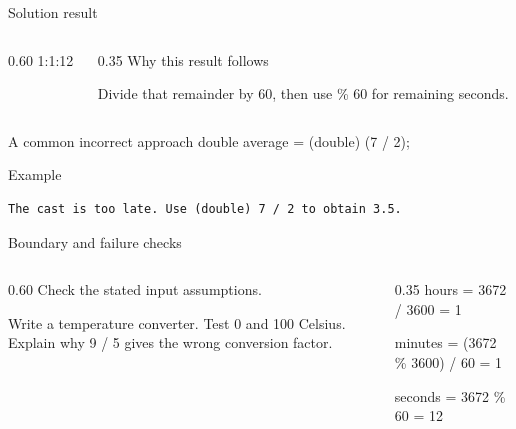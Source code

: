 \documentclass[10pt,aspectratio=169]{beamer}
\begin{document}
\begin{frame}[fragile,t]{Solution result}
\begin{columns}[T,onlytextwidth]\begin{column}{0.60\textwidth}
1:1:12
\end{column}\begin{column}{0.35\textwidth}\small
Why this result follows

Divide that remainder by 60, then use \% 60 for remaining seconds.
\end{column}\end{columns}
\end{frame}

\begin{frame}[fragile,t]{A common incorrect approach}
double average = (double) (7 / 2);
\vspace{1mm}\begin{block}{Example}
\begin{lstlisting}
The cast is too late. Use (double) 7 / 2 to obtain 3.5.
\end{lstlisting}
\end{block}
\end{frame}

\begin{frame}[fragile,t]{Boundary and failure checks}
\begin{columns}[T,onlytextwidth]\begin{column}{0.60\textwidth}
Check the stated input assumptions.

Write a temperature converter. Test 0 and 100 Celsius. Explain why 9 / 5 gives the wrong conversion factor.
\end{column}\begin{column}{0.35\textwidth}\small
hours = 3672 / 3600 = 1\par minutes = (3672 \% 3600) / 60 = 1\par seconds = 3672 \% 60 = 12
\end{column}\end{columns}
\end{frame}
\end{document}
